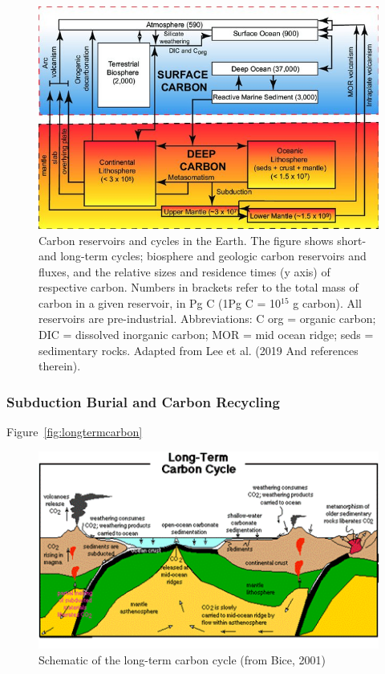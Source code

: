 \documentclass{book}\usepackage{knitr}
\begin{document}
\begin{knitrout}
\begin{kframe}
\begin{figure}
\includegraphics[width=\linewidth]{images/earth-system/Carbon-reservoirs-and-cycles-in-the-Earth.jpg}
\caption{Carbon reservoirs and cycles in the Earth. The figure shows short-and long-term cycles; biosphere and geologic carbon reservoirs and fluxes, and the relative sizes and residence times (y axis) of respective carbon. Numbers in brackets refer to the total mass of carbon in a given reservoir, in Pg C (1Pg C = 10$^{15}$ g carbon). All reservoirs are pre-industrial. Abbreviations: C org = organic carbon; DIC = dissolved inorganic carbon; MOR = mid ocean ridge; seds = sedimentary rocks. Adapted from Lee et al. (2019 And references therein).}
\label{fig:carbonpools}
\end{figure}

\subsubsection{Subduction Burial and Carbon Recycling}

Figure~\ref{fig:longtermcarbon}

\begin{figure}
\includegraphics[width=\linewidth]{images/earth-system/long-term-carbon.png}
\caption{Schematic of the long-term carbon cycle (from Bice, 2001)}
\label{longtermcarbon}
\end{figure}


\end{kframe}
\end{knitrout}
\end{document}
